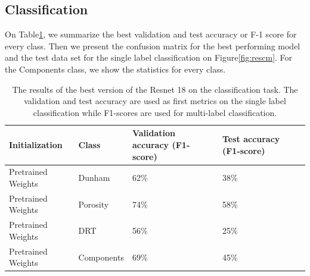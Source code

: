 \subsection{Classification}
On Table\ref{tab:resbest}, we summarize the best validation and test accuracy or F-1 score for every class. Then we present the confusion matrix for the best performing model and the test data set for the single label classification on Figure\ref{fig:rescm}. For the Components class, we show the statistics for every class. 

\begin{table}
\caption{\label{tab:resbest} The results of the best version of the Resnet 18 on the classification task. The validation and test accuracy are used as first metrics on the single label classification while F1-scores are used for multi-label classification.}
\centering
\begin{tabular}[b]{| l | l | l | l | l |}
\hline
    Initialization & Class & Validation accuracy (F1-score) & Test accuracy (F1-score) \ \\ \hline
    Pretrained Weights & Dunham &  62\%  & 38\% \\ \hline
    Pretrained Weights & Porosity & 74\%  &  58\% \\ \hline
    Pretrained Weights &DRT & 56\% &  25\% \\ \hline
    Pretrained Weights &Components & 69\% &  45\% \\ \hline
\end{tabular} 
\end{table}

